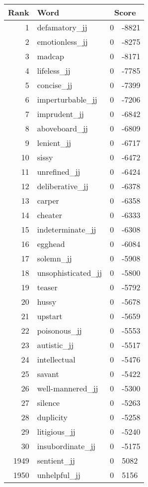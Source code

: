 \begin{longtable}[!htbp]{| rlr@{.}l |}
    \hline
    \textbf{Rank} & \textbf{Word} & \multicolumn{2}{c|}{\textbf{Score}} \\
    \hline
    \endhead
    1 & defamatory\_jj & 0 & -8821 \\
    2 & emotionless\_jj & 0 & -8275 \\
    3 & madcap & 0 & -8171 \\
    4 & lifeless\_jj & 0 & -7785 \\
    5 & concise\_jj & 0 & -7399 \\
    6 & imperturbable\_jj & 0 & -7206 \\
    7 & imprudent\_jj & 0 & -6842 \\
    8 & aboveboard\_jj & 0 & -6809 \\
    9 & lenient\_jj & 0 & -6717 \\
    10 & sissy & 0 & -6472 \\
    11 & unrefined\_jj & 0 & -6424 \\
    12 & deliberative\_jj & 0 & -6378 \\
    13 & carper & 0 & -6358 \\
    14 & cheater & 0 & -6333 \\
    15 & indeterminate\_jj & 0 & -6308 \\
    16 & egghead & 0 & -6084 \\
    17 & solemn\_jj & 0 & -5908 \\
    18 & unsophisticated\_jj & 0 & -5800 \\
    19 & teaser & 0 & -5792 \\
    20 & hussy & 0 & -5678 \\
    21 & upstart & 0 & -5659 \\
    22 & poisonous\_jj & 0 & -5553 \\
    23 & autistic\_jj & 0 & -5517 \\
    24 & intellectual & 0 & -5476 \\
    25 & savant & 0 & -5422 \\
    26 & well-mannered\_jj & 0 & -5300 \\
    27 & silence & 0 & -5263 \\
    28 & duplicity & 0 & -5258 \\
    29 & litigious\_jj & 0 & -5240 \\
    30 & insubordinate\_jj & 0 & -5175 \\
    1949 & sentient\_jj & 0 & 5082 \\
    1950 & unhelpful\_jj & 0 & 5156 \\

\end{longtable}
